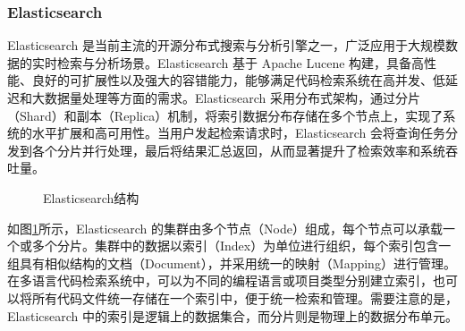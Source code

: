 \documentclass[UTF8,a4paper,12pt]{ctexart}
\numberwithin{equation}{section}
\begin{document}
\subsubsection{Elasticsearch}

Elasticsearch 是当前主流的开源分布式搜索与分析引擎之一，广泛应用于大规模数据的实时检索与分析场景。Elasticsearch 基于 Apache Lucene 构建，具备高性能、良好的可扩展性以及强大的容错能力，能够满足代码检索系统在高并发、低延迟和大数据量处理等方面的需求。Elasticsearch 采用分布式架构，通过分片（Shard）和副本（Replica）机制，将索引数据分布存储在多个节点上，实现了系统的水平扩展和高可用性。当用户发起检索请求时，Elasticsearch 会将查询任务分发到各个分片并行处理，最后将结果汇总返回，从而显著提升了检索效率和系统吞吐量。\par

\begin{figure}[H]
	\caption{Elasticsearch结构}
	\label{es}
\end{figure}

如图\ref{es}所示，Elasticsearch 的集群由多个节点（Node）组成，每个节点可以承载一个或多个分片。集群中的数据以索引（Index）为单位进行组织，每个索引包含一组具有相似结构的文档（Document），并采用统一的映射（Mapping）进行管理。在多语言代码检索系统中，可以为不同的编程语言或项目类型分别建立索引，也可以将所有代码文件统一存储在一个索引中，便于统一检索和管理。需要注意的是，Elasticsearch 中的索引是逻辑上的数据集合，而分片则是物理上的数据分布单元。\par
\end{document}
